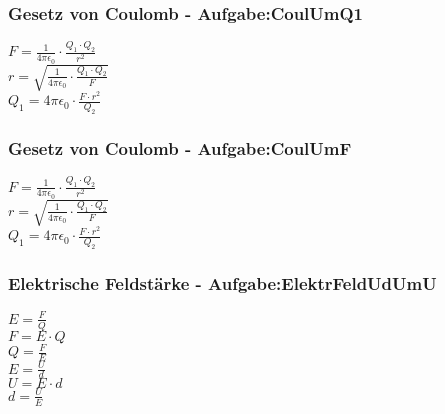 \subsubsection{Gesetz von Coulomb - Aufgabe:CoulUmQ1} 
\begin{minipage}{0.45\textwidth} 
$ F = \frac{ 1}{4\pi \epsilon _{0} } \cdot  \frac{Q_{1} \cdot Q_{2} }{  r^{2} } $\\ 
$ r = \sqrt{\frac{  1}{4\pi \epsilon _{0} } \cdot  \frac{Q_{1} \cdot Q_{2} }{  F}} $\\ 
$ Q_{1}  = 4\pi \epsilon _{0}  \cdot  \frac{F\cdot r^{2} }{ Q_{2} } $\\ 
\end{minipage} 
\begin{minipage}{0.45\textwidth} 
 
\end{minipage} 
\subsubsection{Gesetz von Coulomb - Aufgabe:CoulUmF} 
\begin{minipage}{0.45\textwidth} 
$ F = \frac{ 1}{4\pi \epsilon _{0} } \cdot  \frac{Q_{1} \cdot Q_{2} }{  r^{2} } $\\ 
$ r = \sqrt{\frac{  1}{4\pi \epsilon _{0} } \cdot  \frac{Q_{1} \cdot Q_{2} }{  F}} $\\ 
$ Q_{1}  = 4\pi \epsilon _{0}  \cdot  \frac{F\cdot r^{2} }{ Q_{2} } $\\ 
\end{minipage} 
\begin{minipage}{0.45\textwidth} 
 
\end{minipage} 
\subsubsection{Elektrische Feldstärke - Aufgabe:ElektrFeldUdUmU} 
\begin{minipage}{0.45\textwidth} 
$ E = \frac{F}{Q} $\\ 
$ F = E\cdot Q $\\ 
$ Q = \frac{F}{E} $\\ 
$ E = \frac{U}{d} $\\ 
$ U = E\cdot d $\\ 
$ d = \frac{U}{E} $\\ 
\end{minipage} 
\begin{minipage}{0.45\textwidth} 
 
\end{minipage} 
